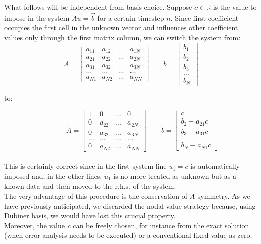 \documentclass[a4paper,11pt]{article}
\begin{document}
\noindent What follows will be independent from basis choice. Suppose $c\in \mathbb{R}$ is the value to impose in the system $Au=\vec{b}$ for a certain timestep $n$. Since first coefficient occupies the first cell in the unknown vector and influences other coefficient values only through the first matrix column, we can switch the system from: \\

\begin{equation*}
A=\begin{bmatrix}
a_{11} & a_{12} & \dots & a_{1N} \\ 
a_{21} & a_{22} & \dots & a_{2N} \\ 
a_{31} &a_{32} & \dots & a_{3N} \\
\dots & \dots & \dots & \dots \\
a_{N1}  & a_{N2} & \dots & a_{NN}
\end{bmatrix} \quad \quad
b=\begin{bmatrix}
b_1 \\ b_2 \\ b_3 \\ \dots \\ b_N
\end{bmatrix}
\end{equation*}

to:

\begin{equation*}
\quad \quad  \quad \, \tilde{A}=\begin{bmatrix}
1 & 0 & \dots & 0 \\ 
0 & a_{22} & \dots & a_{2N} \\ 
0 &a_{32} & \dots & a_{3N} \\
\dots & \dots & \dots & \dots \\
0  & a_{N2} & \dots & a_{NN}
\end{bmatrix} \quad \quad
\tilde{b}=\begin{bmatrix}
c \\ b_2 -a_{21}c \\ b_3-a_{31}c \\ \dots \\ b_N-a_{N1}c
\end{bmatrix}
\end{equation*}
\vspace{4mm} \\
\noindent This is certainly correct since in the first system line $u_1=c$ is automatically imposed and, in the other lines, $u_1$ is no more treated as unknown but as a known data and then moved to the r.h.s. of the system. \\
The very advantage of this procedure is the conservation of $A$ symmetry. As we have previously anticipated, we discarded the nodal value strategy because, using Dubiner basis, we would have lost this crucial property. \\
Moreover, the value $c$ can be freely chosen, for instance from the exact solution (when error analysis needs to be executed) or a conventional fixed value as zero. \\ 
\end{document}
